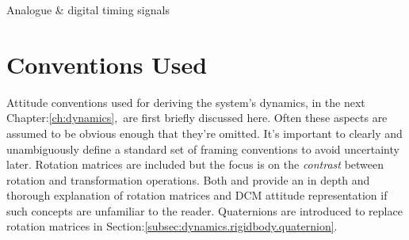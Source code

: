 \begin{table}[h]
\centering
{}
\caption{Analogue \& digital timing signals}
\label{tab:servo}
\end{table}
\section{Conventions Used}
\label{sec:proto.conventions}
Attitude conventions used for deriving the system's dynamics, in the next Chapter:\ref{ch:dynamics},~are first briefly discussed here. Often these aspects are assumed to be obvious enough that they're omitted. It's important to clearly and unambiguously define a standard set of framing conventions to avoid uncertainty later. Rotation matrices are included but the focus is on the \emph{contrast} between rotation and transformation operations. Both \cite{spacecraftattitutdequaternions} and \cite{rigidbodylecture} provide an in depth and thorough explanation of rotation matrices and DCM attitude representation if such concepts are unfamiliar to the reader. Quaternions are introduced to replace rotation matrices in Section:\ref{subsec:dynamics.rigidbody.quaternion}.
